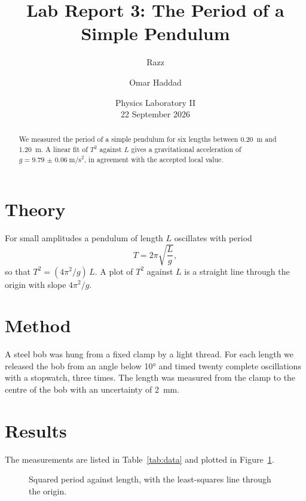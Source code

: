 \documentclass[11pt,a4paper]{article}
\title{Lab Report 3: The Period of a Simple Pendulum}
\author{Razz \and Omar Haddad}
\date{Physics Laboratory II \\ 22 September 2026}
\begin{document}
\maketitle

\begin{abstract}
We measured the period of a simple pendulum for six lengths between \SI{0.20}{\metre} and \SI{1.20}{\metre}. A linear fit of $T^2$ against $L$ gives a gravitational acceleration of $g = \SI{9.79(6)}{\metre\per\second\squared}$, in agreement with the accepted local value.
\end{abstract}

\section{Theory}

For small amplitudes a pendulum of length $L$ oscillates with period
\begin{equation}
  T = 2\pi \sqrt{\frac{L}{g}},
  \label{eq:period}
\end{equation}
so that $T^2 = (4\pi^2 / g) \, L$. A plot of $T^2$ against $L$ is a straight line through the origin with slope $4\pi^2 / g$.

\section{Method}

A steel bob was hung from a fixed clamp by a light thread. For each length we released the bob from an angle below \ang{10} and timed twenty complete oscillations with a stopwatch, three times. The length was measured from the clamp to the centre of the bob with an uncertainty of \SI{2}{\milli\metre}.

\section{Results}

The measurements are listed in Table~\ref{tab:data} and plotted in Figure~\ref{fig:fit}.



\begin{figure}[ht]
  \centering
  \caption{Squared period against length, with the least-squares line through the origin.}
  \label{fig:fit}
\end{figure}
\end{document}
